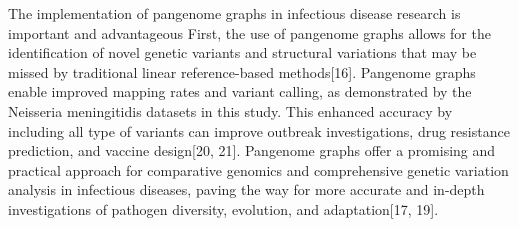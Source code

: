 The implementation of pangenome graphs in infectious disease research is important and advantageous First, the use of pangenome graphs allows for the identification of novel genetic variants and structural variations that may be missed by traditional linear reference-based methods[16]. Pangenome graphs enable improved mapping rates and variant calling, as demonstrated by the Neisseria meningitidis datasets in this study. This enhanced accuracy by including all type of variants can improve outbreak investigations, drug resistance prediction, and vaccine design[20, 21]. Pangenome graphs offer a promising and practical approach for comparative genomics and comprehensive genetic variation analysis in infectious diseases, paving the way for more accurate and in-depth investigations of pathogen diversity, evolution, and adaptation[17, 19].

